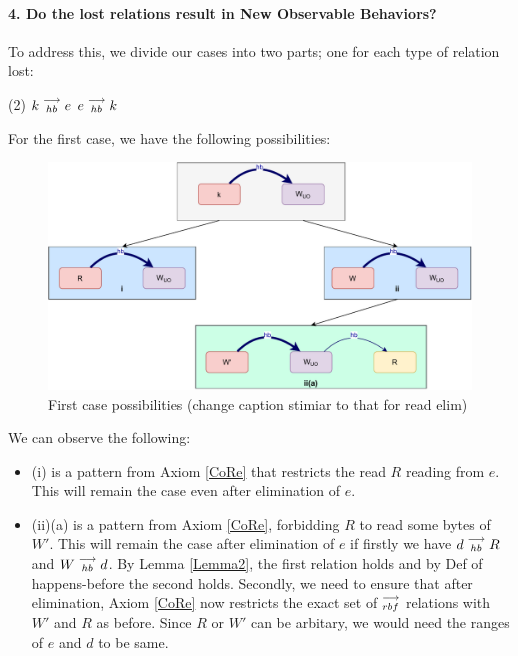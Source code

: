 \paragraph{4. Do the lost relations result in New Observable Behaviors?}

    To address this, we divide our cases into two parts; one for each type of relation lost:
    \begin{tasks}(2)
        \task $k\stackrel{\longrightarrow}{_{hb}}e$
        \task $e\stackrel{\longrightarrow}{_{hb}}k$
    \end{tasks}

    For the first case, we have the following possibilities:
    \begin{figure}[H]
        \centering
        \includegraphics[scale=0.5]{Elimination/1.ValidEliminationCandidate/WriteElimProof/ProofParts/Part4Case1.pdf}
        \caption{First case possibilities (change caption stimiar to that for read elim)}
    \end{figure}

    We can observe the following:
    \begin{itemize}
        \item (i) is a pattern from Axiom \ref{CoRe} that restricts the read $R$ reading from $e$. This will remain the case even after elimination of $e$.
        \item (ii)(a) is a pattern from Axiom \ref{CoRe}, forbidding $R$ to read some bytes of $W'$. 
        This will remain the case after elimination of $e$ if firstly we have $d\stackrel{\longrightarrow}{_{hb}}R$ and $W\stackrel{\longrightarrow}{_{hb}}d$.
        By Lemma \ref{Lemma2}, the first relation holds and by Def of happens-before the second holds. 
        Secondly, we need to ensure that after elimination, Axiom \ref{CoRe} now restricts the exact set of $\stackrel{\longrightarrow}{_{rbf}}$ relations with $W'$ and $R$ as before. 
        Since $R$ or $W'$ can be arbitary, we would need the ranges of $e$ and $d$ to be same.
    \end{itemize}

